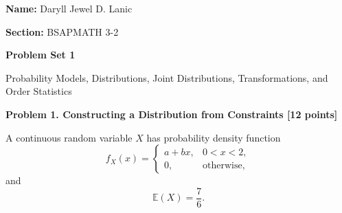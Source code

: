 \documentclass[letterpaper,12pt]{article}
\begin{document}
\noindent
\begin{minipage}{0.5\textwidth}
    \raggedright
    \textbf{Name:} Daryll Jewel D. Lanic
\end{minipage}%
\begin{minipage}{0.5\textwidth}
    \raggedleft
    \textbf{Section:} BSAPMATH 3-2
\end{minipage}

\vspace{1.5em}

\begin{center}
	{\LARGE\bfseries Problem Set 1}\par
	\vspace{0.5em}
	{\large Probability Models, Distributions, Joint Distributions, Transformations, and Order Statistics}\par
\end{center}

\vspace{2em}

\noindent\textbf{Problem 1. Constructing a Distribution from Constraints [12 points]}
\vspace{0.5em}

A continuous random variable $X$ has probability density function
\[
f_X(x) = 
\begin{cases} 
a + bx, & 0 < x < 2, \\ 
0, & \text{otherwise}, 
\end{cases}
\]
and
\[\mathbb{E}(X) = \frac{7}{6}.\]
\end{document}
